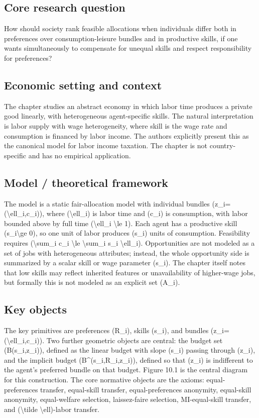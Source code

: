 \documentclass[11pt,a4paper]{article}
\begin{document}
\subsection*{Core research question}
How should society rank feasible allocations when individuals differ both in preferences over consumption-leisure bundles and in productive skills, if one wants simultaneously to compensate for unequal skills and respect responsibility for preferences?

\subsection*{Economic setting and context}
The chapter studies an abstract economy in which labor time produces a private good linearly, with heterogeneous agent-specific skills. The natural interpretation is labor supply with wage heterogeneity, where skill is the wage rate and consumption is financed by labor income. The authors explicitly present this as the canonical model for labor income taxation. The chapter is not country-specific and has no empirical application.

\subsection*{Model / theoretical framework}
The model is a static fair-allocation model with individual bundles (z\_i=(\textbackslash{}ell\_i,c\_i)), where (\textbackslash{}ell\_i) is labor time and (c\_i) is consumption, with labor bounded above by full time (\textbackslash{}ell\_i \textbackslash{}le 1). Each agent has a productive skill (s\_i\textbackslash{}ge 0), so one unit of labor produces (s\_i) units of consumption. Feasibility requires (\textbackslash{}sum\_i c\_i \textbackslash{}le \textbackslash{}sum\_i s\_i \textbackslash{}ell\_i). Opportunities are not modeled as a set of jobs with heterogeneous attributes; instead, the whole opportunity side is summarized by a scalar skill or wage parameter (s\_i). The chapter itself notes that low skills may reflect inherited features or unavailability of higher-wage jobs, but formally this is not modeled as an explicit set (A\_i).

\subsection*{Key objects}
The key primitives are preferences (R\_i), skills (s\_i), and bundles (z\_i=(\textbackslash{}ell\_i,c\_i)). Two further geometric objects are central: the budget set (B(s\_i,z\_i)), defined as the linear budget with slope (s\_i) passing through (z\_i), and the implicit budget (B\textasciicircum{}(s\_i,R\_i,z\_i)), defined so that (z\_i) is indifferent to the agent’s preferred bundle on that budget. Figure 10.1 is the central diagram for this construction. The core normative objects are the axioms: equal-preferences transfer, equal-skill transfer, equal-preferences anonymity, equal-skill anonymity, equal-welfare selection, laissez-faire selection, MI-equal-skill transfer, and (\textbackslash{}tilde \textbackslash{}ell)-labor transfer.
\end{document}
